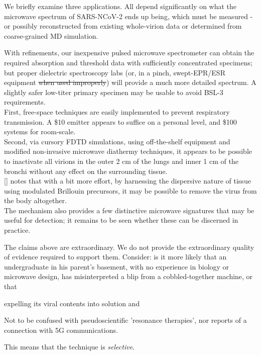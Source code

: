 \documentclass[paper.tex]{subfiles}
\begin{document}
We briefly examine three applications. All depend significantly on what the microwave spectrum of SARS-NCoV-2 ends up being, which must be measured - or possibly reconstructed from existing whole-virion data or determined from coarse-grained MD simulation. 

With refinements, our inexpensive pulsed microwave spectrometer can obtain the required absorption and threshold data with sufficiently concentrated specimens; but proper dielectric spectroscopy labs (or, in a pinch, swept-EPR/ESR equipment \st{when used improperly}) will provide a much more detailed spectrum. A slightly safer low-titer primary specimen may be usable to avoid BSL-3 requirements. \\



First, free-space techniques are easily implemented to prevent respiratory transmission. A \$10 emitter appears to suffice on a personal level, and \$100 systems for room-scale.\\

%
Second, via cursory FDTD simulations, using off-the-shelf equipment and modified non-invasive microwave diathermy techniques, it appears to be possible to inactivate all virions in the outer 2 cm of the lungs and inner 1 cm of the bronchi without any effect on the surrounding tissue. 
\\

[] notes that with a bit more effort, by harnessing the dispersive nature of tissue using modulated Brillouin precursors, it may be possible to remove the virus from the body altogether.\\

The mechanism also provides a few distinctive microwave signatures that may be useful for detection; it remains to be seen whether these can be discerned in practice.

The claims above are extraordinary. We do not provide the extraordinary quality of evidence required to support them. Consider: is it more likely that an undergraduate in his parent's basement, with no experience in biology or microwave design, has misinterpreted a blip from a cobbled-together machine, or that 

expelling its viral contents into solution and 

Not to be confused with pseudoscientific 'resonance therapies', nor reports of a connection with 5G communications.

This means that the technique is {\it selective}.
\end{document}

